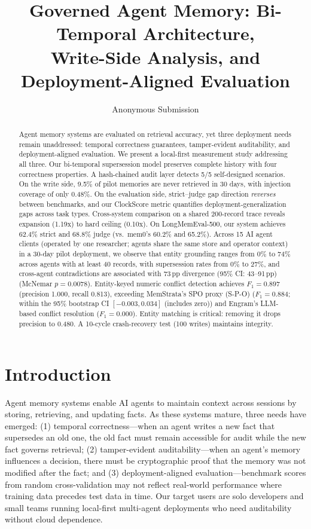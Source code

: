 \documentclass{llncs}
\begin{document}
\title{Governed Agent Memory: Bi-Temporal Architecture,\\Write-Side Analysis, and Deployment-Aligned Evaluation}

\author{Anonymous Submission}
\maketitle

\begin{abstract}
Agent memory systems are evaluated on retrieval accuracy, yet three deployment needs remain unaddressed: temporal correctness guarantees, tamper-evident auditability, and deployment-aligned evaluation. We present a local-first measurement study addressing all three. Our bi-temporal supersession model preserves complete history with four correctness properties. A hash-chained audit layer detects 5/5 self-designed scenarios. On the write side, 9.5\% of pilot memories are never retrieved in 30 days, with injection coverage of only 0.48\%. On the evaluation side, strict--judge gap direction \emph{reverses} between benchmarks, and our ClockScore metric quantifies deployment-generalization gaps across task types. Cross-system comparison on a shared 200-record trace reveals expansion (1.19x) to hard ceiling (0.10x). On LongMemEval-500, our system achieves 62.4\% strict and 68.8\% judge (vs.\ mem0's 60.2\% and 65.2\%). Across 15 AI agent clients (operated by one researcher; agents share the same store and operator context) in a 30-day pilot deployment, we observe that entity grounding ranges from 0\% to 74\% across agents with at least 40 records, with supersession rates from 0\% to 27\%, and cross-agent contradictions are associated with 73\,pp divergence (95\% CI: 43--91\,pp) (McNemar $p{=}0.0078$). Entity-keyed numeric conflict detection achieves $F_1{=}0.897$ (precision 1.000, recall 0.813), exceeding MemStrata's SPO proxy (S-P-O) ($F_1{=}0.884$; within the 95\% bootstrap CI $[-0.003, 0.034]$ (includes zero)) and Engram's LLM-based conflict resolution ($F_1{=}0.000$). Entity matching is critical: removing it drops precision to 0.480. A 10-cycle crash-recovery test (100 writes) maintains integrity.
\end{abstract}
\section{Introduction}
Agent memory systems enable AI agents to maintain context across sessions by storing, retrieving, and updating facts. As these systems mature, three needs have emerged: (1) temporal correctness---when an agent writes a new fact that supersedes an old one, the old fact must remain accessible for audit while the new fact governs retrieval; (2) tamper-evident auditability---when an agent's memory influences a decision, there must be cryptographic proof that the memory was not modified after the fact; and (3) deployment-aligned evaluation---benchmark scores from random cross-validation may not reflect real-world performance where training data precedes test data in time. Our target users are solo developers and small teams running local-first multi-agent deployments who need auditability without cloud dependence.
\end{document}

